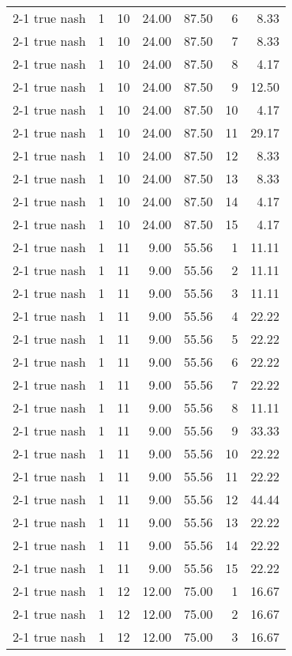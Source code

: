 \begin{tabular}{lrrrrrr}
2-1  true nash & 1 & 10 & 24.00 & 87.50 & 6 & 8.33 \\
2-1  true nash & 1 & 10 & 24.00 & 87.50 & 7 & 8.33 \\
2-1  true nash & 1 & 10 & 24.00 & 87.50 & 8 & 4.17 \\
2-1  true nash & 1 & 10 & 24.00 & 87.50 & 9 & 12.50 \\
2-1  true nash & 1 & 10 & 24.00 & 87.50 & 10 & 4.17 \\
2-1  true nash & 1 & 10 & 24.00 & 87.50 & 11 & 29.17 \\
2-1  true nash & 1 & 10 & 24.00 & 87.50 & 12 & 8.33 \\
2-1  true nash & 1 & 10 & 24.00 & 87.50 & 13 & 8.33 \\
2-1  true nash & 1 & 10 & 24.00 & 87.50 & 14 & 4.17 \\
2-1  true nash & 1 & 10 & 24.00 & 87.50 & 15 & 4.17 \\
2-1  true nash & 1 & 11 & 9.00 & 55.56 & 1 & 11.11 \\
2-1  true nash & 1 & 11 & 9.00 & 55.56 & 2 & 11.11 \\
2-1  true nash & 1 & 11 & 9.00 & 55.56 & 3 & 11.11 \\
2-1  true nash & 1 & 11 & 9.00 & 55.56 & 4 & 22.22 \\
2-1  true nash & 1 & 11 & 9.00 & 55.56 & 5 & 22.22 \\
2-1  true nash & 1 & 11 & 9.00 & 55.56 & 6 & 22.22 \\
2-1  true nash & 1 & 11 & 9.00 & 55.56 & 7 & 22.22 \\
2-1  true nash & 1 & 11 & 9.00 & 55.56 & 8 & 11.11 \\
2-1  true nash & 1 & 11 & 9.00 & 55.56 & 9 & 33.33 \\
2-1  true nash & 1 & 11 & 9.00 & 55.56 & 10 & 22.22 \\
2-1  true nash & 1 & 11 & 9.00 & 55.56 & 11 & 22.22 \\
2-1  true nash & 1 & 11 & 9.00 & 55.56 & 12 & 44.44 \\
2-1  true nash & 1 & 11 & 9.00 & 55.56 & 13 & 22.22 \\
2-1  true nash & 1 & 11 & 9.00 & 55.56 & 14 & 22.22 \\
2-1  true nash & 1 & 11 & 9.00 & 55.56 & 15 & 22.22 \\
2-1  true nash & 1 & 12 & 12.00 & 75.00 & 1 & 16.67 \\
2-1  true nash & 1 & 12 & 12.00 & 75.00 & 2 & 16.67 \\
2-1  true nash & 1 & 12 & 12.00 & 75.00 & 3 & 16.67 \\

\end{tabular}
